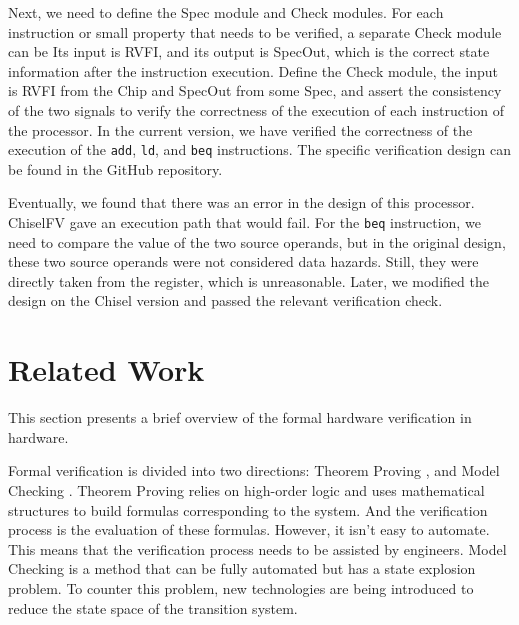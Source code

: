 \documentclass[conference]{IEEEtran}
\theoremstyle{definition}
\begin{document}
Next, we need to define the Spec module and Check modules. For each instruction or small property that needs to be verified, a separate Check module can be 
Its input is RVFI, and its output is SpecOut, which is the correct state information after the instruction execution. Define the Check module, the input is RVFI from the Chip and SpecOut from some Spec, and assert the consistency of the two signals to verify the correctness of the execution of each instruction of the processor.
In the current version, we have verified the correctness of the execution of the \verb|add|, \verb|ld|, and \verb|beq| instructions.
The specific verification design can be found in the GitHub repository.

Eventually, we found that there was an error in the design of this processor. ChiselFV gave an execution path that would fail. For the \verb|beq| instruction, we need to compare the value of the two source operands, but in the original design, these two source operands were not considered data hazards. Still, they were directly taken from the register, which is unreasonable. Later, we modified the design on the Chisel version and passed the relevant verification check.



\section{Related Work}
This section presents a brief overview of the formal hardware verification in hardware.

Formal verification is divided into two directions: Theorem Proving \cite{Hoare69}, and Model Checking \cite{clarke2018handbook}. Theorem Proving relies on high-order logic and uses mathematical structures to build formulas corresponding to the system. And the verification process is the evaluation of these formulas. However, it isn't easy to automate. This means that the verification process needs to be assisted by engineers. Model Checking is a method that can be fully automated but has a state explosion problem. To counter this problem, new technologies are being introduced to reduce the state space of the transition system.
\end{document}
